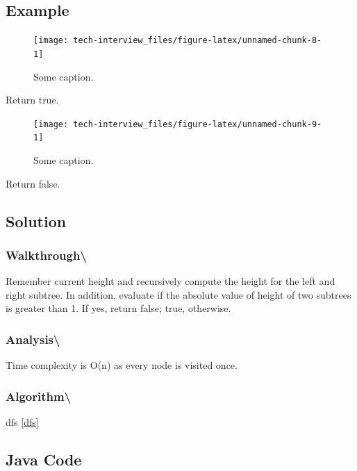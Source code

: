 \documentclass[]{book}
\begin{document}
\hypertarget{example-49}{%
\subsection{Example}\label{example-49}}

\begin{figure}
\texttt{[image: tech-interview\_files/figure-latex/unnamed-chunk-8-1]} \caption{Some caption.}\label{fig:unnamed-chunk-8}
\end{figure}

Return true.

\begin{figure}
\texttt{[image: tech-interview\_files/figure-latex/unnamed-chunk-9-1]} \caption{Some caption.}\label{fig:unnamed-chunk-9}
\end{figure}

Return false.

\hypertarget{solution-35}{%
\subsection{Solution}\label{solution-35}}

\hypertarget{walkthrough-50}{%
\subsubsection{Walkthrough\textbackslash{}}\label{walkthrough-50}}

Remember current height and recursively compute the height for the left and right subtree. In
addition, evaluate if the absolute value of height of two subtrees is greater than 1. If yes, return false; true,
otherwise.

\hypertarget{analysis-57}{%
\subsubsection{Analysis\textbackslash{}}\label{analysis-57}}

Time complexity is O(n) as every node is visited once.

\hypertarget{algorithm-59}{%
\subsubsection{Algorithm\textbackslash{}}\label{algorithm-59}}

dfs \ref{dfs}

\hypertarget{java-code-41}{%
\subsection{Java Code}\label{java-code-41}}
\end{document}

